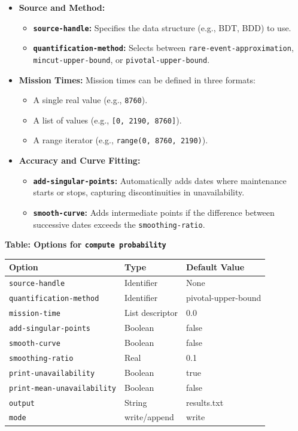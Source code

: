\begin{itemize}
    \item \textbf{Source and Method:}
    \begin{itemize}
        \item \textbf{\texttt{source-handle}:} Specifies the data structure (e.g., BDT, BDD) to use.
        \item \textbf{\texttt{quantification-method}:} Selects between \texttt{rare-event-approximation}, \texttt{mincut-upper-bound}, or \texttt{pivotal-upper-bound}.
    \end{itemize}
    \item \textbf{Mission Times:} Mission times can be defined in three formats:
    \begin{itemize}
        \item A single real value (e.g., \texttt{8760}).
        \item A list of values (e.g., \texttt{[0, 2190, 8760]}).
        \item A range iterator (e.g., \texttt{range(0, 8760, 2190)}).
    \end{itemize}
    \item \textbf{Accuracy and Curve Fitting:}
    \begin{itemize}
        \item \textbf{\texttt{add-singular-points}:} Automatically adds dates where maintenance starts or stops, capturing discontinuities in unavailability.
        \item \textbf{\texttt{smooth-curve}:} Adds intermediate points if the difference between successive dates exceeds the \texttt{smoothing-ratio}.
    \end{itemize}
\end{itemize}

\textbf{Table: Options for \texttt{compute probability}}

\begin{center}
\begin{tabular}{lll}
\hline
\textbf{Option} & \textbf{Type} & \textbf{Default Value} \\ \hline
\texttt{source-handle} & Identifier & None \\
\texttt{quantification-method} & Identifier & pivotal-upper-bound \\
\texttt{mission-time} & List descriptor & 0.0 \\
\texttt{add-singular-points} & Boolean & false \\
\texttt{smooth-curve} & Boolean & false \\
\texttt{smoothing-ratio} & Real & 0.1 \\
\texttt{print-unavailability} & Boolean & true \\
\texttt{print-mean-unavailability} & Boolean & false \\
\texttt{output} & String & results.txt \\
\texttt{mode} & write/append & write \\ \hline
\end{tabular}
\end{center}

